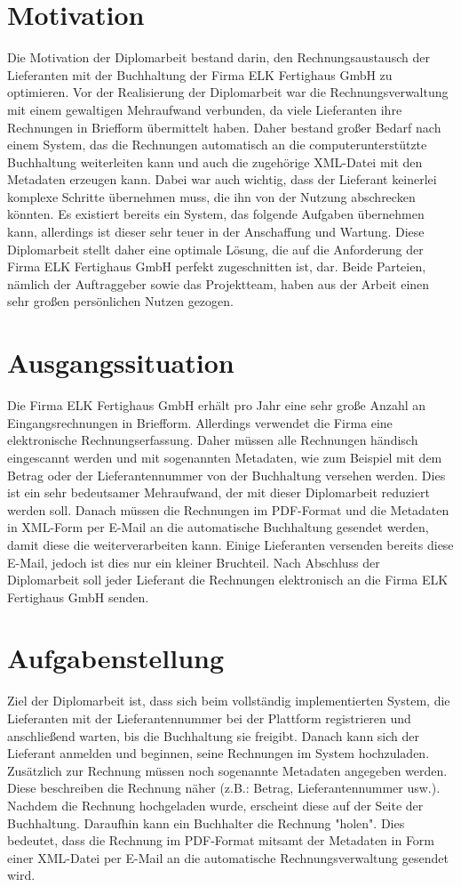 \section{Motivation}
Die Motivation der Diplomarbeit bestand darin, den Rechnungsaustausch der Lieferanten mit der Buchhaltung der Firma ELK Fertighaus GmbH zu optimieren. Vor der Realisierung der Diplomarbeit war die Rechnungsverwaltung mit einem gewaltigen Mehraufwand verbunden, da viele Lieferanten ihre Rechnungen in Briefform übermittelt haben. Daher bestand großer Bedarf nach einem System, das die Rechnungen automatisch an die computerunterstützte Buchhaltung weiterleiten kann und auch die zugehörige XML-Datei mit den Metadaten erzeugen kann. Dabei war auch wichtig, dass der Lieferant keinerlei komplexe Schritte übernehmen muss, die ihn von der Nutzung abschrecken könnten. Es existiert bereits ein System, das folgende Aufgaben übernehmen kann, allerdings ist dieser sehr teuer in der Anschaffung und Wartung. Diese Diplomarbeit stellt daher eine optimale Lösung, die auf die Anforderung der Firma ELK Fertighaus GmbH perfekt zugeschnitten ist, dar. Beide Parteien, nämlich der Auftraggeber sowie das Projektteam, haben aus der Arbeit einen sehr großen persönlichen Nutzen gezogen.

\section{Ausgangssituation}
Die Firma ELK Fertighaus GmbH erhält pro Jahr eine sehr große Anzahl an Eingangsrechnungen in Briefform. Allerdings verwendet die Firma eine elektronische Rechnungserfassung. Daher müssen alle Rechnungen händisch eingescannt werden und mit sogenannten Metadaten, wie zum Beispiel mit dem Betrag oder der Lieferantennummer von der Buchhaltung versehen werden. Dies ist ein sehr bedeutsamer Mehraufwand, der mit dieser Diplomarbeit reduziert werden soll. Danach müssen die Rechnungen im PDF-Format und die Metadaten in XML-Form per E-Mail an die automatische Buchhaltung gesendet werden, damit diese die weiterverarbeiten kann. Einige Lieferanten versenden bereits diese E-Mail, jedoch ist dies nur ein kleiner Bruchteil. Nach Abschluss der Diplomarbeit soll jeder Lieferant die Rechnungen elektronisch an die Firma ELK Fertighaus GmbH senden.

\section{Aufgabenstellung}
Ziel der Diplomarbeit ist, dass sich beim vollständig implementierten System, die Lieferanten mit der Lieferantennummer bei der Plattform registrieren und anschließend warten, bis die Buchhaltung sie freigibt. Danach kann sich der Lieferant anmelden und beginnen, seine Rechnungen im System hochzuladen. Zusätzlich zur Rechnung müssen noch sogenannte Metadaten angegeben werden. Diese beschreiben die Rechnung näher (z.B.: Betrag, Lieferantennummer usw.). Nachdem die Rechnung hochgeladen wurde, erscheint diese auf der Seite der Buchhaltung. Daraufhin kann ein Buchhalter die Rechnung "holen". Dies bedeutet, dass die Rechnung im PDF-Format mitsamt der Metadaten in Form einer XML-Datei per E-Mail an die automatische Rechnungsverwaltung gesendet wird.

